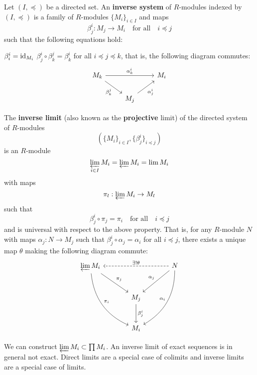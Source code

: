 \begin{defn}[1.16]
	\begin{enum}
		\io Let $(I,\preceq)$ be a directed set.
		An \textbf{inverse system} of $R$-modules indexed by $(I,\preceq)$ is a family of $R$-modules $\{M_i\}_{i \in I}$ and maps
		\[\beta_j^i: M_j \to M_i \quad \text{for all} \quad i \preceq j\]
		such that the following equations hold:
		\begin{enum}
			\io $\beta_i^i= \operatorname{id}_{M_i}$
			\io $\beta_j^i \circ \beta_k^j = \beta_k^i$ for all $i \preceq j \preceq k$, that is, the following diagram commutes:
			\[
			\begin{tikzcd}
			M_k \arrow[rd, "\beta_k^j"'] \arrow[rr, "\alpha_k^i"] &  & M_i \\
			& M_j \arrow[ru, "\alpha_j^i"'] & 
			\end{tikzcd}
			\]
		\end{enum}
		\io The \textbf{inverse limit} (also known as the \textbf{projective} limit)
		of the directed system of $R$-modules
		\[\left(\{M_i\}_{i \in I}, \{\beta_j^i\}_{i \preceq j}\right)\]
		is an $R$-module
		\[\varprojlim_{i \in I} M_i = \varprojlim M_i = \lim M_i\]
		with maps
		\[\pi_l: \varprojlim M_i \to M_l\]
		such that
		\[\beta_j^i \circ \pi_j = \pi_i \quad \text{for all} \quad i \preceq j\]
		and is universal with respect to the above property.
		That is, for any $R$-module $N$ with maps $\alpha_j: N \to M_j$ such that $\beta_j^i \circ \alpha_j=\alpha_i$ for all $i \preceq j$, there exists a unique map $\theta$ making the following diagram commute:
		\[
		\begin{tikzcd}[row sep=large, column sep=large]
		\varprojlim M_i \arrow[rd, "\pi_j"] \arrow[rdd, "\pi_i", bend right] & & N \arrow[ll, "\exists !\theta", dashed, swap] \arrow[ld, "\alpha_j" '] \arrow[ldd, "\alpha_i" ', bend left]\\
		& M_j \arrow[d, "\beta_j^i"] &  \\
		& M_i & 
		\end{tikzcd}
		\]
	\end{enum}
\end{defn}

\begin{rmk}
	\leavevmode
	\begin{enum}
		\io We can construct $\varprojlim M_i \subset \prod M_i$.
		\io An inverse limit of exact sequences is in general not exact.
		\io Direct limits are a special case of colimits and inverse limits are a special case of limits.
	\end{enum}
\end{rmk}
